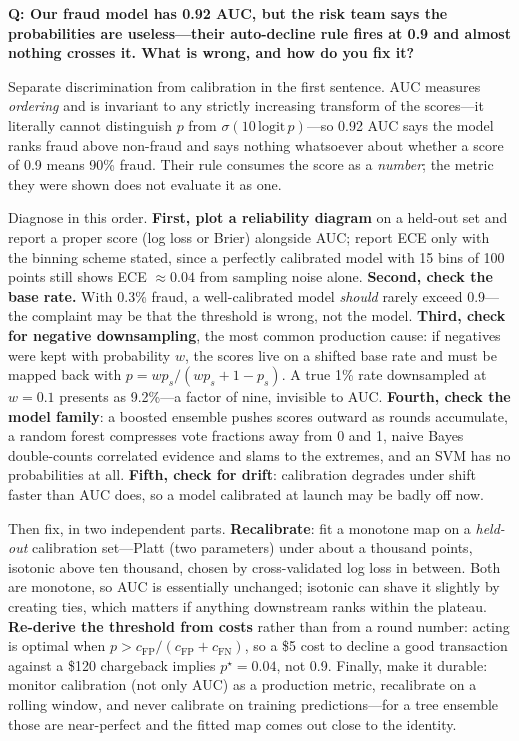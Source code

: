 \begin{interviewq}
\textbf{Q: Our fraud model has 0.92 AUC, but the risk team says the probabilities are useless---their auto-decline rule fires at 0.9 and almost nothing crosses it. What is wrong, and how do you fix it?}

 \quad {} \quad \badgefreq{\freqhigh}

\stronganswer

Separate discrimination from calibration in the first sentence. AUC measures \textit{ordering} and is invariant to any strictly increasing transform of the scores---it literally cannot distinguish $p$ from $\sigma(10\,\mathrm{logit}\,p)$---so 0.92 AUC says the model ranks fraud above non-fraud and says nothing whatsoever about whether a score of 0.9 means 90\% fraud. Their rule consumes the score as a \textit{number}; the metric they were shown does not evaluate it as one.

Diagnose in this order. \textbf{First, plot a reliability diagram} on a held-out set and report a proper score (log loss or Brier) alongside AUC; report ECE only with the binning scheme stated, since a perfectly calibrated model with 15 bins of 100 points still shows ECE $\approx 0.04$ from sampling noise alone. \textbf{Second, check the base rate.} With 0.3\% fraud, a well-calibrated model \textit{should} rarely exceed 0.9---the complaint may be that the threshold is wrong, not the model. \textbf{Third, check for negative downsampling}, the most common production cause: if negatives were kept with probability $w$, the scores live on a shifted base rate and must be mapped back with $p = w p_s / (w p_s + 1 - p_s)$. A true 1\% rate downsampled at $w = 0.1$ presents as 9.2\%---a factor of nine, invisible to AUC. \textbf{Fourth, check the model family}: a boosted ensemble pushes scores outward as rounds accumulate, a random forest compresses vote fractions away from 0 and 1, naive Bayes double-counts correlated evidence and slams to the extremes, and an SVM has no probabilities at all. \textbf{Fifth, check for drift}: calibration degrades under shift faster than AUC does, so a model calibrated at launch may be badly off now.

Then fix, in two independent parts. \textbf{Recalibrate}: fit a monotone map on a \textit{held-out} calibration set---Platt (two parameters) under about a thousand points, isotonic above ten thousand, chosen by cross-validated log loss in between. Both are monotone, so AUC is essentially unchanged; isotonic can shave it slightly by creating ties, which matters if anything downstream ranks within the plateau. \textbf{Re-derive the threshold from costs} rather than from a round number: acting is optimal when $p > c_{\text{FP}}/(c_{\text{FP}} + c_{\text{FN}})$, so a \$5 cost to decline a good transaction against a \$120 chargeback implies $p^\star = 0.04$, not 0.9. Finally, make it durable: monitor calibration (not only AUC) as a production metric, recalibrate on a rolling window, and never calibrate on training predictions---for a tree ensemble those are near-perfect and the fitted map comes out close to the identity.


\end{interviewq}
